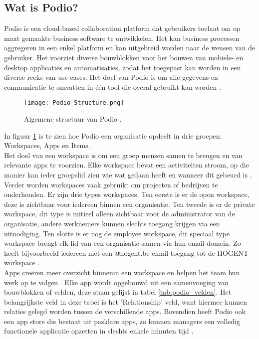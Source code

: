 \subsection{Wat is Podio?}
\label{subsec:wat_is_podio}

Podio is een cloud-based collaboration platform dat gebruikers toelaat om op maat gemaakte business software te ontwikkelen. Het kan business processen aggregeren in een enkel platform en kan uitgebreid worden naar de wensen van de gebruiker. Het voorziet diverse bouwblokken voor het bouwen van mobiele- en desktop applicaties en automatisaties, zodat het toegepast kan worden in een diverse reeks van use cases. Het doel van Podio is om alle gegevens en communicatie te omvatten in één tool die overal gebruikt kan worden \autocite{Podio}. \\ 

\begin{figure}[hb]
    \centering
    \texttt{[image: Podio\_Structure.png]}
    \caption[Structuur Podio]{Algemene structuur van Podio \autocite{TallyfyPodio}.}
    \label{fig:podio_structure}
\end{figure}

In figuur \ref{fig:podio_structure} is te zien hoe Podio een organisatie opdeelt in drie groepen: Workspaces, Apps en Items. \\

Het doel van een workspace is om een groep mensen samen te brengen en van relevante apps te voorzien. Elke workspace bevat een activiteiten stroom, op die manier kan ieder groepslid zien wie wat gedaan heeft en wanneer dit gebeurd is \autocite{TallyfyPodio}. Verder worden workspaces vaak gebruikt om projecten of bedrijven te onderhouden. Er zijn drie types workspaces. Ten eerste is er de open workspace, deze is zichtbaar voor iedereen binnen een organisatie. Ten tweede is er de private workspace, dit type is initieel alleen zichtbaar voor de administrator van de organisatie, andere werknemers kunnen slechts toegang krijgen via een uitnodiging. Ten slotte is er nog de employee workspace, dit speciaal type workspace brengt elk lid van een organisatie samen via hun email domein. Zo heeft bijvoorbeeld iedereen met een @hogent.be email toegang tot de HOGENT workspace \autocite{PodioFeatures}. \\

Apps creëren meer overzicht binnenin een workspace en helpen het team hun werk op te volgen \autocite{PodioFeatures}. Elke app wordt opgebouwd uit een samenvoeging van bouwblokken of velden, deze staan gelijst in tabel \ref{tab:podio_velden}. Het belangrijkste veld in deze tabel is het 'Relationship' veld, want hiermee kunnen relaties gelegd worden tussen de verschillende apps. Bovendien heeft Podio ook een app store die bestaat uit pasklare apps, zo kunnen managers een volledig functionele applicatie opzetten in slechts enkele minuten tijd \autocite{TallyfyPodio}. \\

